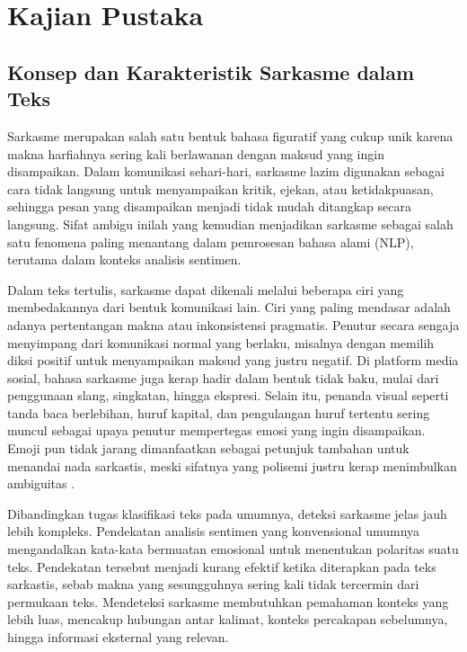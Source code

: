 \chapter{Kajian Pustaka}

\section{Konsep dan Karakteristik Sarkasme dalam Teks}

Sarkasme merupakan salah satu bentuk bahasa figuratif yang cukup unik karena makna harfiahnya sering kali berlawanan dengan maksud yang ingin disampaikan. Dalam komunikasi sehari-hari, sarkasme lazim digunakan sebagai cara tidak langsung untuk menyampaikan kritik, ejekan, atau ketidakpuasan, sehingga pesan yang disampaikan menjadi tidak mudah ditangkap secara langsung. Sifat ambigu inilah yang kemudian menjadikan sarkasme sebagai salah satu fenomena paling menantang dalam pemrosesan bahasa alami (NLP), terutama dalam konteks analisis sentimen.

Dalam teks tertulis, sarkasme dapat dikenali melalui beberapa ciri yang membedakannya dari bentuk komunikasi lain. Ciri yang paling mendasar adalah adanya pertentangan makna atau inkonsistensi pragmatis. Penutur secara sengaja menyimpang dari komunikasi normal yang berlaku, misalnya dengan memilih diksi positif untuk menyampaikan maksud yang justru negatif. Di platform media sosial, bahasa sarkasme juga kerap hadir dalam bentuk tidak baku, mulai dari penggunaan slang, singkatan, hingga ekspresi. Selain itu, penanda visual seperti tanda baca berlebihan, huruf kapital, dan pengulangan huruf tertentu sering muncul sebagai upaya penutur mempertegas emosi yang ingin disampaikan. Emoji pun tidak jarang dimanfaatkan sebagai petunjuk tambahan untuk menandai nada sarkastis, meski sifatnya yang polisemi justru kerap menimbulkan ambiguitas \cite{grover2026emoji}.

Dibandingkan tugas klasifikasi teks pada umumnya, deteksi sarkasme jelas jauh lebih kompleks. Pendekatan analisis sentimen yang konvensional umumnya mengandalkan kata-kata bermuatan emosional untuk menentukan polaritas suatu teks. Pendekatan tersebut menjadi kurang efektif ketika diterapkan pada teks sarkastis, sebab makna yang sesungguhnya sering kali tidak tercermin dari permukaan teks. Mendeteksi sarkasme membutuhkan pemahaman konteks yang lebih luas, mencakup hubungan antar kalimat, konteks percakapan sebelumnya, hingga informasi eksternal yang relevan.

